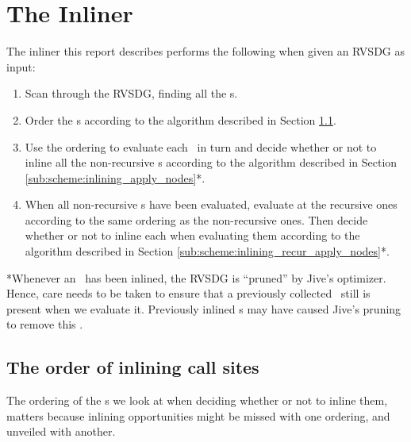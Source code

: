 
\clearpage
\section{The Inliner}


The inliner this report describes performs the following when given an RVSDG as
input:

\begin{enumerate}

	\item Scan through the RVSDG, finding all the \applyNode s.

	\item Order the \applyNode s according to the algorithm described in Section
\ref{sub:scheme:ordering_apply_nodes}.

	\item Use the ordering to evaluate each \applyNode~in turn and decide
whether or not to inline all the non-recursive \applyNode s according to the
algorithm described in Section \ref{sub:scheme:inlining_apply_nodes}*.

	\item When all non-recursive \applyNode s have been evaluated, evaluate at
the recursive ones according to the same ordering as the non-recursive ones.
Then decide whether or not to inline each when evaluating them according to the
algorithm described in Section \ref{sub:scheme:inlining_recur_apply_nodes}*.

\end{enumerate}

*Whenever an \applyNode~has been inlined, the RVSDG is ``pruned'' by Jive's
optimizer. Hence, care needs to be taken to ensure that a previously collected
\applyNode~still is present when we evaluate it. Previously inlined \applyNode s
may have caused Jive's pruning to remove this \applyNode .

\subsection{The order of inlining call sites}
\label{sub:scheme:ordering_apply_nodes}


The ordering of the \applyNode s we look at when deciding whether or not to
inline them, matters because inlining opportunities might be missed with one
ordering, and unveiled with another.


